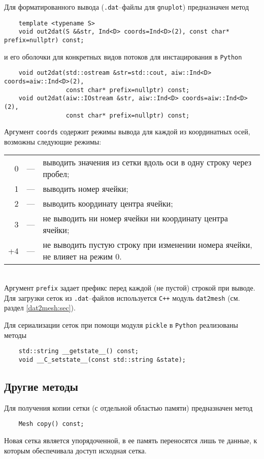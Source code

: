 Для форматированного вывода (\verb'.dat'--файлы для \verb'gnuplot') предназначен метод
\begin{verbatim}		
    template <typename S> 
    void out2dat(S &&str, Ind<D> coords=Ind<D>(2), const char* prefix=nullptr) const;
\end{verbatim}
и его оболочки для конкретных видов потоков для инстацирования в \verb'Python'
\begin{verbatim}		
    void out2dat(std::ostream &str=std::cout, aiw::Ind<D> coords=aiw::Ind<D>(2), 
                 const char* prefix=nullptr) const;
    void out2dat(aiw::IOstream &str, aiw::Ind<D> coords=aiw::Ind<D>(2), 
                 const char* prefix=nullptr) const;
\end{verbatim}
Аргумент \verb'coords' содержит режимы вывода для каждой из координатных осей, возможны следующие режимы:\\ 
\begin{tabular}{rcl}
0 & --- & выводить значения из сетки вдоль оси в одну строку через пробел;\\
1 & --- & выводить номер ячейки;\\
2 & --- & выводить координату центра ячейки;\\
3 & --- & не выводить ни номер ячейки ни координату центра ячейки;\\
+4 & --- & не выводить пустую строку при изменении номера ячейки, не влияет на режим 0.
\end{tabular}\\
Аргумент \verb'prefix' задает префикс перед каждой (не пустой) строкой при выводе.
Для загрузки сеток из \verb'.dat'--файлов используется \verb'C++' модуль \verb'dat2mesh' (см. раздел \ref{dat2mesh:sec}).

Для сериализации сеток при помощи модуля \verb'pickle' в \verb'Python' реализованы методы
\begin{verbatim}		
    std::string __getstate__() const; 
    void __C_setstate__(const std::string &state);
\end{verbatim}

		
\subsection{Другие методы}
Для получения копии сетки (с отдельной областью памяти) предназначен метод
\begin{verbatim}		
    Mesh copy() const;
\end{verbatim}
Новая сетка является упорядоченной, в ее память переносятся лишь те данные, к которым обеспечивала доступ исходная сетка.

